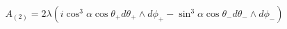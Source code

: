 \begin{equation}
A_{(2)} = 2 \lambda (i \cos^3 \alpha \cos \theta_+
d \theta_+ \wedge d \phi_+
- \sin^3 \alpha  \cos \theta_-  d \theta_- \wedge d \phi_-)
\end{equation}

